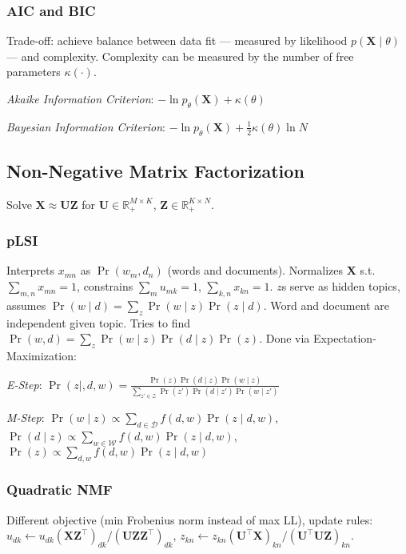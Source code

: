 \documentclass[11pt,a4paper,technote]{IEEEtran}
\newcommand{\matr}[1]{\boldsymbol{\mathbf{#1}}}
\newcommand{\vect}[1]{\boldsymbol{\mathbf{#1}}}
\newcommand{\trns}[1]{#1^{\top}}
\newcommand{\set}[1]{\mathcal{#1}}
\newcommand{\R}{\mathbb{R}}
\begin{document}
\subsubsection*{AIC and BIC}
Trade-off: achieve balance between data fit --- measured by likelihood
$p(\matr{X}\mid\theta)$ --- and complexity. Complexity can be measured by
the number of free parameters $\kappa(\cdot)$.

\emph{Akaike Information Criterion}: $-\ln p_{\theta}(\matr{X})+\kappa(\theta)$

\emph{Bayesian Information Criterion}: $-\ln p_{\theta}(\matr{X})+\frac{1}{2}
\kappa(\theta)\ln N$

\vspace{-1em}
\subsection*{Non-Negative Matrix Factorization}
Solve $\matr{X}\approx\matr{U}\matr{Z}$ for $\matr{U}\in\R_{+}^{M\times K}$,
$\matr{Z}\in\R_{+}^{K\times N}$.
\subsubsection*{pLSI}
Interprets $x_{mn}$ as $\Pr(w_m, d_n)$ (words and documents).
Normalizes $\matr{X}$ s.t.\ $\sum_{m,n} x_{mn} = 1$, constrains $\sum_m u_{mk} = 1$,
$\sum_{k,n} x_{kn} = 1$. $z$s serve as hidden topics, assumes $\Pr(w\mid d) =
\sum_{z} \Pr(w\mid z)\Pr(z\mid d)$. Word and document are independent given topic.
Tries to find $\Pr(w,d) = \sum_{z} \Pr(w\mid z)\Pr(d\mid z)\Pr(z)$.
Done via Expectation-Maximization:

\emph{E-Step}:
$\Pr(z\mid,d,w) = \frac{\Pr(z)\Pr(d\mid z)\Pr(w\mid z)}{\sum_{z'\in\set{Z}}
  \Pr(z')\Pr(d\mid z')\Pr(w\mid z')}$

\emph{M-Step}:
$\Pr(w\mid z)\propto \sum_{d\in\set{D}} f(d,w) \Pr(z\mid d,w)$,
$\Pr(d\mid z)\propto \sum_{w\in\set{W}} f(d,w) \Pr(z\mid d,w)$,
$\Pr(z) \propto \sum_{d,w} f(d,w) \Pr(z\mid d,w)$
\subsubsection*{Quadratic NMF}
Different objective (min Frobenius norm instead of max LL), update rules:
$u_{dk} \gets u_{dk} {(\matr{X}\trns{\matr{Z}})}_{dk} /
{(\matr{U}\matr{Z}\trns{\matr{Z}})}_{dk}$,
$z_{kn} \gets z_{kn} {(\trns{\matr{U}}\matr{X})}_{kn} /
{(\trns{\matr{U}}\matr{U}\matr{Z})}_{kn}$.

\end{document}

